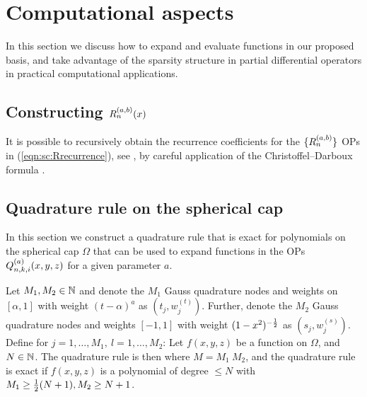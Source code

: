 %
\section{Computational aspects}\label{Section:sc:Computation}

In this section we discuss how to expand and evaluate functions in our proposed basis, and take advantage of the sparsity structure in partial differential operators in practical computational applications.


\subsection{Constructing $R_n^{(a,b)}(x)$}

It is possible to recursively obtain the recurrence coefficients for the $\{R_n^{(a,b)}\}$ OPs in (\ref{eqn:sc:Rrecurrence}), see \cite{snowball2019sparse}, by careful application of the Christoffel--Darboux formula \cite[18.2.12]{DLMF}.


\subsection{Quadrature rule on the spherical cap}\label{section:sc:quadrule}

In this section we construct a quadrature rule that is exact for polynomials on the spherical cap $\Omega$ that can be used to expand functions in the OPs $Q_{n,k,i}^{(a)}(x,y,z)$ for a given parameter $a$.

\begin{theorem}\label{theorem:sc:quadrule}
	Let $M_1, M_2 \in \mathbb{N}$ and denote the $M_1$ Gauss quadrature nodes and weights on $[\alpha,1]$ with weight $(t - \alpha)^a$ as $(t_j, w_j^{(t)})$. Further, denote the $M_2$ Gauss quadrature nodes and weights $[-1,1]$ with weight $(1 - x^2)^{-\frac{1}{2}}$ as $(s_j, w_j^{(s)})$.
Define for $j = 1,\dots,M_1, \: l=1,\dots,M_2$:
Let $f(x,y,z)$ be a function on $\Omega$, and $N \in \mathbb{N}$. The quadrature rule is then
where $M = M_1 \: M_2$, and the quadrature rule is exact if $f(x,y,z)$ is a polynomial of degree $\le N$ with $M_1 \ge \frac{1}{2} (N+1), M_2 \ge N+1$.
\end{theorem}

